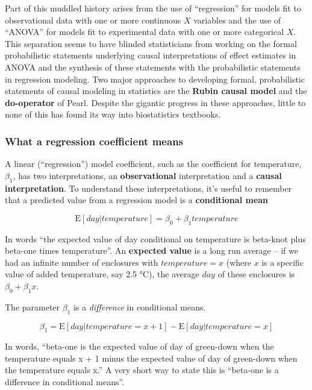 \documentclass[]{book}
\begin{document}
Part of this muddled history arises from the use of ``regression'' for models fit to observational data with one or more continuous \(X\) variables and the use of ``ANOVA'' for models fit to experimental data with one or more categorical \(X\). This separation seems to have blinded statisticians from working on the formal probabilistic statements underlying causal interpretations of effect estimates in ANOVA and the synthesis of these statements with the probabilistic statements in regression modeling. Two major approaches to developing formal, probabilistic statements of causal modeling in statistics are the \textbf{Rubin causal model} and the \textbf{do-operator} of Pearl. Despite the gigantic progress in these approaches, little to none of this has found its way into biostatistics textbooks.

\hypertarget{what-a-regression-coefficient-means}{%
\subsubsection{What a regression coefficient means}\label{what-a-regression-coefficient-means}}

A linear (``regression'') model coefficient, such as the coefficient for temperature, \(\beta_1\), has two interpretations, an \textbf{observational} interpretation and a \textbf{causal interpretation}. To understand these interpretations, it's useful to remember that a predicted value from a regression model is a \textbf{conditional mean}

\begin{equation}
\textrm{E}[day|temperature] = \beta_0 + \beta_1 temperature
\label{eq:continuous-x-conditional-mean}
\end{equation}

In words ``the expected value of day conditional on temperature is beta-knot plus beta-one times temperature''. An \textbf{expected value} is a long run average -- if we had an infinite number of enclosures with \(temperature=x\) (where \(x\) is a specific value of added temperature, say 2.5 °C), the average \(day\) of these enclosures is \(\beta_0 + \beta_1 x\).

The parameter \(\beta_1\) is a \emph{difference} in conditional means.

\begin{equation}
\beta_1 = \textrm{E}[day|temperature = x+1] - \textrm{E}[day|temperature = x]
\label{eq:beta}
\end{equation}

In words, ``beta-one is the expected value of day of green-down when the temperature equals x + 1 minus the expected value of day of green-down when the temperature equals x.'' A very short way to state this is ``beta-one is a difference in conditional means''.
\end{document}
